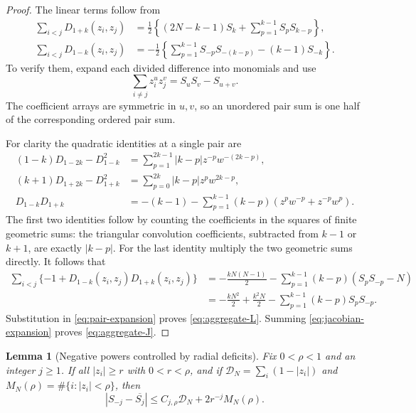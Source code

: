 \documentclass[11pt,a4paper]{article}
\numberwithin{equation}{section}
\newtheorem{lemma}[theorem]{Lemma}
\theoremstyle{definition}
\theoremstyle{remark}
\begin{document}
\begin{proof}
The linear terms follow from
\begin{align*}
 \sum_{i<j}D_{1+k}(z_i,z_j)
 &=\frac12\left\{(2N-k-1)S_k+
                         \sum_{p=1}^{k-1}S_pS_{k-p}\right\},\\
 \sum_{i<j}D_{1-k}(z_i,z_j)
 &=-\frac12\left\{\sum_{p=1}^{k-1}S_{-p}S_{-(k-p)}
                                     -(k-1)S_{-k}\right\}.
\end{align*}
To verify them, expand each divided difference into monomials and use
\[
 \sum_{i\ne j}z_i^u z_j^v=S_uS_v-S_{u+v}.
\]
The coefficient arrays are symmetric in $u,v$, so an unordered pair
sum is one half of the corresponding ordered pair sum.

For clarity the quadratic identities at a single pair are
\begin{align*}
 (1-k)D_{1-2k}-D_{1-k}^2
 &=\sum_{p=1}^{2k-1}|k-p|z^{-p}w^{-(2k-p)},\\
 (k+1)D_{1+2k}-D_{1+k}^2
 &=\sum_{p=0}^{2k}|k-p|z^p w^{2k-p},\\
 D_{1-k}D_{1+k}
 &=-(k-1)-\sum_{p=1}^{k-1}(k-p)
                         (z^pw^{-p}+z^{-p}w^p).
\end{align*}
The first two identities follow by counting the coefficients in the
squares of finite geometric sums: the triangular convolution
coefficients, subtracted from $k-1$ or $k+1$, are exactly $|k-p|$.
For the last identity multiply the two geometric sums directly.
It follows that
\begin{align*}
 \sum_{i<j}\{-1+D_{1-k}(z_i,z_j)D_{1+k}(z_i,z_j)\}
 &=-\frac{kN(N-1)}2
       -\sum_{p=1}^{k-1}(k-p)(S_pS_{-p}-N)\\
 &=-\frac{kN^2}2+\frac{k^2N}2
       -\sum_{p=1}^{k-1}(k-p)S_pS_{-p}.
\end{align*}
Substitution in \eqref{eq:pair-expansion} proves
\eqref{eq:aggregate-L}. Summing \eqref{eq:jacobian-expansion} proves
\eqref{eq:aggregate-J}.
\end{proof}

\begin{lemma}[Negative powers controlled by radial deficits]
\label{lem:negative-powers}
Fix $0<\rho<1$ and an integer $j\geq1$. If all $|z_i|\geq r$ with
$0<r<\rho$, and if
$\mathcal D_N=\sum_i(1-|z_i|)$ and $M_N(\rho)=\#\{i:|z_i|<\rho\}$, then
\begin{equation}
 |S_{-j}-\overline{S_j}|
 \leq C_{j,\rho}\mathcal D_N+2r^{-j}M_N(\rho).
 \label{eq:negative-power-bound}
\end{equation}
\end{lemma}
\end{document}
